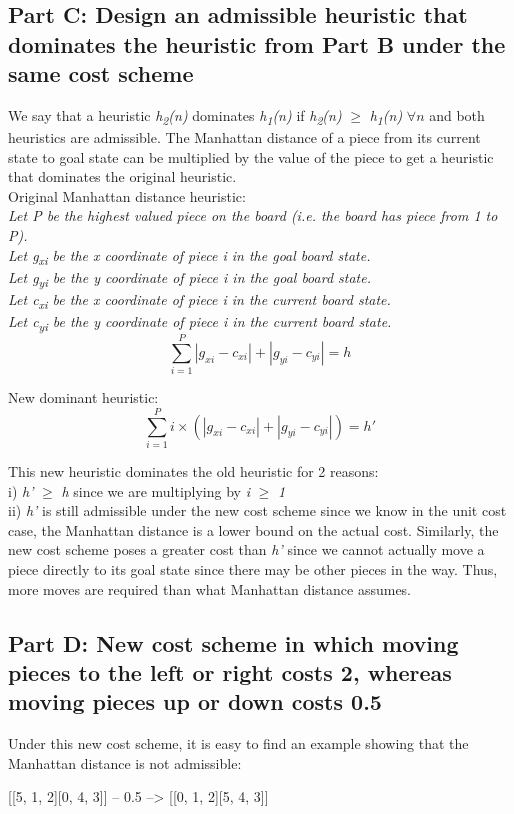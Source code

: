 \documentclass[paper=a4, fontsize=11pt]{scrartcl} %
\numberwithin{equation}{section} %
\numberwithin{figure}{section} %
\numberwithin{table}{section} %
\begin{document}
\subsection{Part C: Design an admissible heuristic that dominates the heuristic from Part B under the same cost scheme}
We say that a heuristic \textit{h\textsubscript{2}(n)} dominates \textit{h\textsubscript{1}(n)} if \textit{h\textsubscript{2}(n)} \(\geq\) \textit{h\textsubscript{1}(n)} \(\forall n\) and both heuristics are admissible. The Manhattan distance of a piece from its current state to goal state can be multiplied by the value of the piece to get a heuristic that dominates the original heuristic.\\
\newline
Original Manhattan distance heuristic: \\
\textit{Let P be the highest valued piece on the board (i.e. the board has piece from 1 to P). \\}
\textit{Let g\textsubscript{xi} be the x coordinate of piece i in the goal board state. \\}
\textit{Let g\textsubscript{yi} be the y coordinate of piece i in the goal board state. \\}
\textit{Let c\textsubscript{xi} be the x coordinate of piece i in the current board state. \\}
\textit{Let c\textsubscript{yi} be the y coordinate of piece i in the current board state. \\}
$$\sum_{i=1}^{P} |g_{xi} - c_{xi}| + |g_{yi} - c_{yi}| = h$$

New dominant heuristic:
$$\sum_{i=1}^{P} i\times(|g_{xi} - c_{xi}| + |g_{yi} - c_{yi}|) = h'$$

This new heuristic dominates the old heuristic for 2 reasons: \\
i) \textit{h'} \(\geq\) \textit{h} since we are multiplying by \textit{i} \(\geq\) \textit{1} \\
ii) \textit{h'} is still admissible under the new cost scheme since we know in the unit cost case, the Manhattan distance is a lower bound on the actual cost. Similarly, the new cost scheme poses a greater cost than \textit{h'} since we cannot actually move a piece directly to its goal state since there may be other pieces in the way. Thus, more moves are required than what Manhattan distance assumes.

\subsection{Part D: New cost scheme in which moving pieces to the left or right costs 2, whereas
moving pieces up or down costs 0.5}
Under this new cost scheme, it is easy to find an example showing that the Manhattan distance is not admissible: \\
\begin{center}
[[5, 1, 2][0, 4, 3]] -- 0.5 --> [[0, 1, 2][5, 4, 3]]
\end{center}
\end{document}
